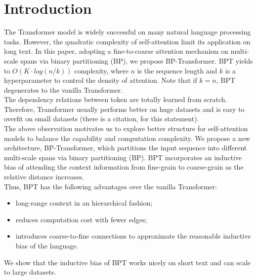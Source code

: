 \section{Introduction}

The Transformer model is widely successful on many natural language processing
tasks. However, the quadratic complexity of self-attention limit its application
on long text. In this paper, adopting a fine-to-coarse attention mechanism on
multi-scale spans via binary partitioning (BP), we propose BP-Transformer. BPT
yields to $O(K \cdot log(n/k))$ complexity, where $n$ is the sequence length and
$k$ is a hyperparameter to control the density of attention. Note that if 
$k = n$, BPT degenerates to the vanilla Transformer.\\

% 
% 

The dependency relations between token are totally learned from scratch.
Therefore, Transformer usually performs better on huge datasets and is easy to
overfit on small datasets (there is a citation, for this statement).\\
The above observation motivates us to explore better structure for
self-attention models to balance the capability and computation complexity.
We propose a new architecture, BP-Transformer, which partitions the input
sequence into different multi-scale spans via binary partitioning (BP). BPT
incorporates an inductive bias of attending the context information from
fine-grain to coarse-grain as the relative distance increases.\\
Thus, BPT has the following advantages over the vanilla Transformer:
\begin{itemize}
    \item long-range context in an hierarchical fashion;
    \item reduces computation cost with fewer edges;
    \item introduces coarse-to-fine connections to approximate the reasonable
        inductive bias of the language.
\end{itemize}

We show that the inductive bias of BPT works nicely on short text and can scale
to large datasets.
